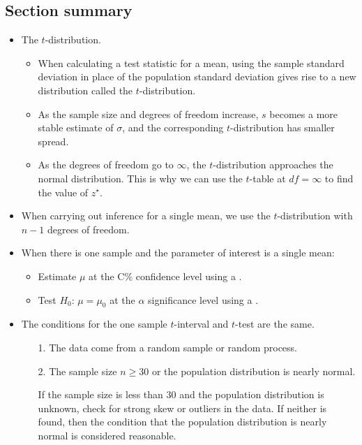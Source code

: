 \subsection*{Section summary}
\begin{itemize} 
\item The $t$-distribution.\vspace{-1mm}
\begin{itemize}
\setlength{\itemsep}{0mm}
\item When calculating a test statistic for a mean, using the sample standard deviation in place of the population standard deviation gives rise to a new distribution called the $t$-distribution.  

\item As the sample size and degrees of freedom increase, $s$ becomes a more stable estimate of $\sigma$, and the corresponding $t$-distribution has smaller spread.  

\item As the degrees of freedom go to $\infty$, the $t$-distribution approaches the normal distribution.  This is why we can use the $t$-table at $df=\infty$ to find the value of $z^{\star}$.
\end{itemize}

\item When carrying out inference for a single mean, we use the $t$-distribution with $n-1$ degrees of freedom.

\item When there is one sample and the parameter of interest is a single mean:
\begin{itemize}
\item Estimate $\mu$ at the C\% confidence level using a .
\item Test $H_0$: $\mu=\mu_0$ at the $\alpha$ significance level using a . 
\end{itemize}

\item The conditions for the one sample $t$-interval and $t$-test are the same.  
\begin{itemize}
\item[1.] The data come from a random sample or random process.
\item[2.]  The sample size $n\ge 30$ or the population distribution is nearly normal.
\item[]  If the sample size is less than 30 and the population distribution is unknown, check for strong skew or outliers in the data.  If neither is found, then the condition that the population distribution is nearly normal is considered reasonable.
\end{itemize}


\end{itemize}
